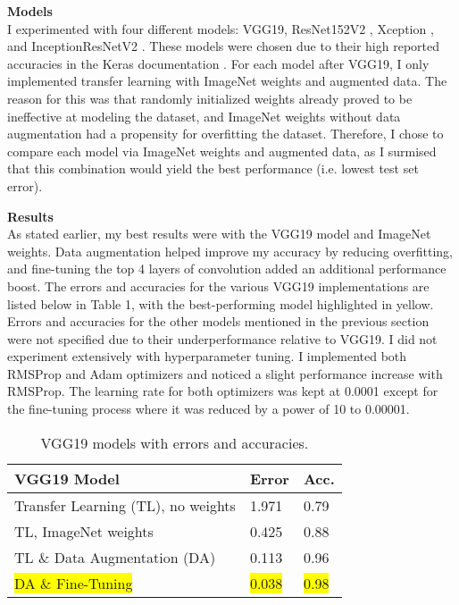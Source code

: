 \documentclass[12pt, letterpaper, onecolumn]{article}
\begin{document}
\vspace{0.125in}
\noindent\textbf{Models}\\
\indent I experimented with four different models: VGG19, ResNet152V2 \cite{resnet}, Xception \cite{xception}, and InceptionResNetV2 \cite{inception}. These models were chosen due to their high reported accuracies in the Keras documentation \cite{keras}. For each model after VGG19, I only implemented transfer learning with ImageNet weights and augmented data. The reason for this was that randomly initialized weights already proved to be ineffective at modeling the dataset, and ImageNet weights without data augmentation had a propensity for overfitting the dataset. Therefore, I chose to compare each model via ImageNet weights and augmented data, as I surmised that this combination would yield the best performance (i.e. lowest test set error). 

\vspace{0.125in}
\noindent\textbf{Results}\\
\indent As stated earlier, my best results were with the VGG19 model and ImageNet weights. Data augmentation helped improve my accuracy by reducing overfitting, and fine-tuning the top 4 layers of convolution added an additional performance boost. The errors and accuracies for the various VGG19 implementations are listed below in Table 1, with the best-performing model highlighted in yellow. Errors and accuracies for the other models mentioned in the previous section were not specified due to their underperformance relative to VGG19. I did not experiment extensively with hyperparameter tuning. I implemented both RMSProp and Adam optimizers and noticed a slight performance increase with RMSProp. The learning rate for both optimizers was kept at 0.0001 except for the fine-tuning process where it was reduced by a power of 10 to 0.00001.

\begin{table}[ht]
\begin{center}
\begin{tabular}{|l|l|l|}
\hline
\textbf{VGG19 Model} & \textbf{Error} & \textbf{Acc.} \\ \hline
Transfer Learning (TL), no weights & 1.971 & 0.79 \\\hline
TL, ImageNet weights & 0.425 & 0.88 \\\hline
TL \& Data Augmentation (DA) & 0.113 & 0.96 \\ \hline
\colorbox{yellow}{DA \& Fine-Tuning} & \colorbox{yellow}{0.038}      & \colorbox{yellow}{0.98} \\ \hline
\end{tabular}
\end{center}
\caption{VGG19 models with errors and accuracies.}
\label{table:ExampleTable}
\end{table}
\end{document}
